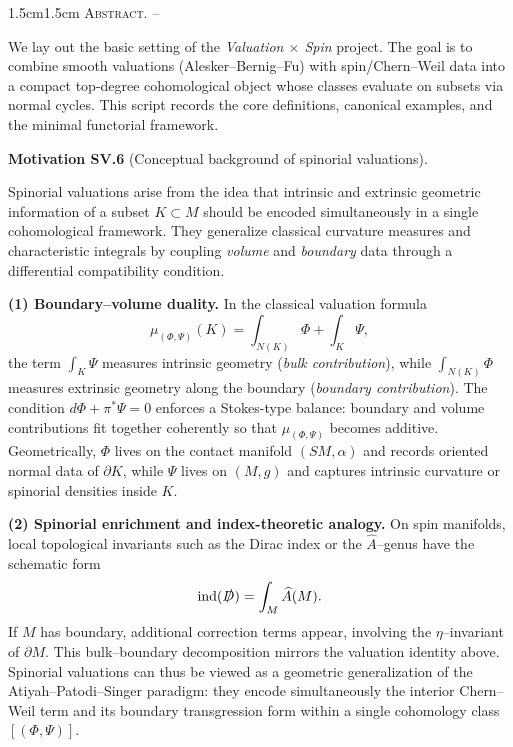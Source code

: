 \documentclass[10pt, letterpaper]{article}
\renewenvironment{abstract}
  {
    \begin{adjustwidth}{1.5cm}{1.5cm}
    \small
    \textsc{Abstract. –}%
  }
  {
    \end{adjustwidth}
  }
\newcommand{\CustomHeading}[3]{%
  \par\medskip\noindent%
  \textbf{#1 #2} \textnormal{(#3)}.\enskip%
}
\newenvironment{MOT}[2]{\begin{unitbox}\CustomHeading{Motivation}{#1}{#2}}{\end{unitbox}}
\begin{document}
\begin{abstract}
We lay out the basic setting of the \emph{Valuation $\times$ Spin} project.
The goal is to combine smooth valuations (Alesker--Bernig--Fu) with spin/Chern--Weil data
into a compact top-degree cohomological object whose classes evaluate on subsets via normal cycles.
This script records the core definitions, canonical examples, and the minimal functorial framework.
\end{abstract}



\begin{MOT}{SV.6}{Conceptual background of spinorial valuations}

Spinorial valuations arise from the idea that intrinsic and extrinsic geometric information of a subset $K\subset M$ should be encoded simultaneously in a single cohomological framework.  
They generalize classical curvature measures and characteristic integrals by coupling \emph{volume} and \emph{boundary} data through a differential compatibility condition.

\medskip\noindent
\textbf{(1) Boundary--volume duality.}
In the classical valuation formula
\[
\mu_{(\Phi,\Psi)}(K)=\int_{N(K)}\Phi+\int_K\Psi,
\]
the term $\int_K\Psi$ measures intrinsic geometry (\emph{bulk contribution}), while $\int_{N(K)}\Phi$ measures extrinsic geometry along the boundary (\emph{boundary contribution}).
The condition $d\Phi+\pi^*\Psi=0$ enforces a Stokes-type balance: boundary and volume contributions fit together coherently so that $\mu_{(\Phi,\Psi)}$ becomes additive.
Geometrically, $\Phi$ lives on the contact manifold $(SM,\alpha)$ and records oriented normal data of $\partial K$, while $\Psi$ lives on $(M,g)$ and captures intrinsic curvature or spinorial densities inside $K$.

\medskip\noindent
\textbf{(2) Spinorial enrichment and index-theoretic analogy.}
On spin manifolds, local topological invariants such as the Dirac index or the $\widehat A$--genus have the schematic form
\[
\mathrm{ind}(\slashed D)=\int_M \widehat A(M).
\]
If $M$ has boundary, additional correction terms appear, involving the $\eta$--invariant of $\partial M$.
This bulk--boundary decomposition mirrors the valuation identity above.
Spinorial valuations can thus be viewed as a geometric generalization of the Atiyah--Patodi--Singer paradigm:
they encode simultaneously the interior Chern--Weil term and its boundary transgression form within a single cohomology class $[(\Phi,\Psi)]$.


\end{MOT}
\end{document}
